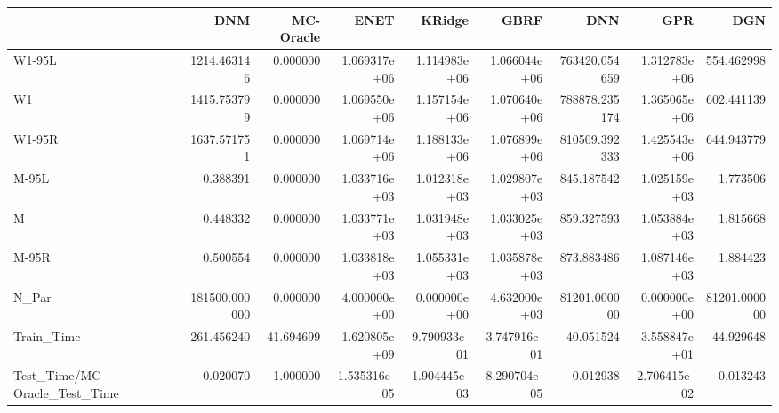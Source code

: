 \begin{tabular}{lrrrrrrrr}
\toprule
{} &            DNM &  MC-Oracle &          ENET &        KRidge &          GBRF &            DNN &           GPR &           DGN \\
\midrule
W1-95L                        &    1214.463146 &   0.000000 &  1.069317e+06 &  1.114983e+06 &  1.066044e+06 &  763420.054659 &  1.312783e+06 &    554.462998 \\
W1                            &    1415.753799 &   0.000000 &  1.069550e+06 &  1.157154e+06 &  1.070640e+06 &  788878.235174 &  1.365065e+06 &    602.441139 \\
W1-95R                        &    1637.571751 &   0.000000 &  1.069714e+06 &  1.188133e+06 &  1.076899e+06 &  810509.392333 &  1.425543e+06 &    644.943779 \\
M-95L                         &       0.388391 &   0.000000 &  1.033716e+03 &  1.012318e+03 &  1.029807e+03 &     845.187542 &  1.025159e+03 &      1.773506 \\
M                             &       0.448332 &   0.000000 &  1.033771e+03 &  1.031948e+03 &  1.033025e+03 &     859.327593 &  1.053884e+03 &      1.815668 \\
M-95R                         &       0.500554 &   0.000000 &  1.033818e+03 &  1.055331e+03 &  1.035878e+03 &     873.883486 &  1.087146e+03 &      1.884423 \\
N\_Par                         &  181500.000000 &   0.000000 &  4.000000e+00 &  0.000000e+00 &  4.632000e+03 &   81201.000000 &  0.000000e+00 &  81201.000000 \\
Train\_Time                    &     261.456240 &  41.694699 &  1.620805e+09 &  9.790933e-01 &  3.747916e-01 &      40.051524 &  3.558847e+01 &     44.929648 \\
Test\_Time/MC-Oracle\_Test\_Time &       0.020070 &   1.000000 &  1.535316e-05 &  1.904445e-03 &  8.290704e-05 &       0.012938 &  2.706415e-02 &      0.013243 \\
\bottomrule
\end{tabular}
